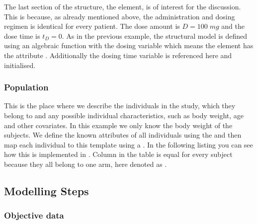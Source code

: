 The last section of the structure, the  element, is of interest for 
the discussion. This is because, as already mentioned above, the administration
and dosing regimen is identical for every patient. The dose amount is $D=100\; mg$ 
and the dose time is $t_D=0$.
As in the previous example, the structural model is defined using an algebraic
function with the dosing variable  which means the  element
has the attribute . Additionally the dosing time variable  is
referenced here and initialised. 



\subsubsection{Population}

This is the place where we describe the individuals in the study, which 
 they belong to and any possible individual characteristics, such as 
body weight, age and other covariates. In this example we only know the
body weight of the subjects. 
We define the known attributes of all individuals using the 
 and then map each individual to this template 
using a . In the following listing 
you can see how this 
is implemented in \pharmml. Column  in the table is equal for
every subject because they all belong to one arm, here denoted as .


\subsection{Modelling Steps}

\subsubsection{Objective data}

